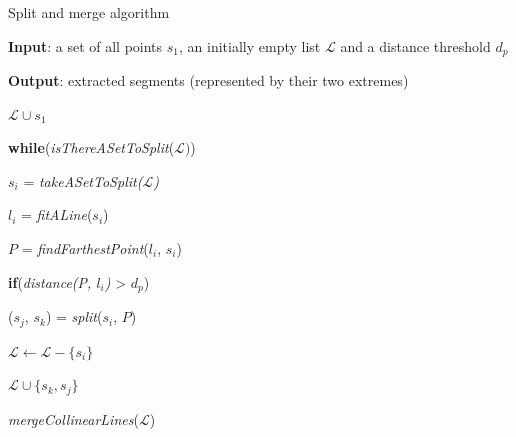 \documentclass[a4paper, onecolumn]{report}
\begin{document}
\begin{algorithm}
\caption{Split and merge algorithm}\label{euclid}
\begin{algorithmic}[1]
\item{\textbf{Input}: a set of all points $s_1$, an initially empty list $\mathcal{L}$ and a distance threshold $d_p$}
\item{\textbf{Output}: extracted segments (represented by their two extremes)}
\item{$\mathcal{L} \cup s_1$}
\item{\textbf{while}(\emph{isThereASetToSplit}($\mathcal{L})$)}
\item{\qquad $s_i$ = \emph{takeASetToSplit($\mathcal{L}$)}}
\item{\qquad $l_i$ = \emph{fitALine}($s_i$)}
\item{\qquad $P$ = \emph{findFarthestPoint}($l_i$, $s_i$)}
\item{\qquad \textbf{if}(\emph{distance(P, $l_i$)} > $d_p$)}
\item{\qquad \qquad ($s_j$, $s_k$) = \emph{split}($s_i$, $P$)}
\item{\qquad \qquad $\mathcal{L} \leftarrow \mathcal{L} - \{s_i\}$}
\item{\qquad \qquad $\mathcal{L} \cup \{s_k, s_j\}$}
\item{\emph{mergeCollinearLines}($\mathcal{L}$)}
\end{algorithmic}
\end{algorithm}
\end{document}
